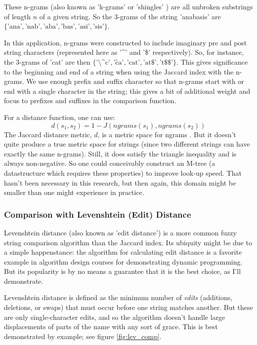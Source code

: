\documentclass[11pt]{article}
\begin{document}
{These n-grams (also known as 'k-grams' or 'shingles' \cite{mining}) are all unbroken substrings of 
length $n$ of a given string. So the 3-grams of the string 'anabasis' are 
$\{\text{'ana'}, \text{'nab'}, \text{'aba'}, \text{'bas'}, \text{'asi'}, \text{'sis'}\}$. 

In this application, n-grams were constructed to include imaginary pre and post string characters
(represented here as '\^{}' and '\$' respectively). So, for instance, the 3-grams of 'cat' are then
$\{\text{'\^{}\^{}c'}, \text{'\^{}ca'}, \text{'cat'}, \text{'at\$'}, \text{'t\$\$'}\}$. This gives
significance to the beginning and end of a string when using the Jaccard index with the n-grams.
We use enough prefix and suffix character so that n-grams start with or end with a single character
in the string; this gives a bit of additional weight and focus to prefixes and suffixes in the 
comparison function.

For a distance function, one can use:
\[d(s_1,s_2) = 1-J(ngrams(s_1),ngrams(s_2))\]
The Jaccard distance metric, $d$, is a metric space for ngrams \cite{data_mining}.
But it doesn't quite produce a true metric space for strings
(since two different strings can have exactly the same n-grams). Still, it does satisfy
the triangle inequality \cite{general} and is always non-negative. So one could
conceivably construct an M-tree \cite{mtree} (a datastructure which requires these properties)
to improve look-up speed. That hasn't been necessary in this research, but then again, 
this domain might be smaller than one might experience in practice.

\subsubsection{Comparison with Levenshtein (Edit) Distance}
Levenshtein distance (also known as 'edit distance') is a more common fuzzy string comparison algorithm
than the Jaccard index. 
Its ubiquity might be due to a simple happenstance: the algorithm for calculating edit distance is
a favorite example in algorithm design courses for demonstrating dynamic programming.
But its popularity is by no means a guarantee that it is the best choice, as I'll demonstrate.

Levenshtein distance is defined as \cite{levenshtein} the minimum number of {\em edits} 
(additions, deletions, or swaps) that must occur before one string matches another.
But these are only single-character edits, and so the algorithm doesn't handle large displacements
of parts of the name with any sort of grace.
This is best demonstrated by example; see figure \ref{fig:lev_comp}.

}
\end{document}

